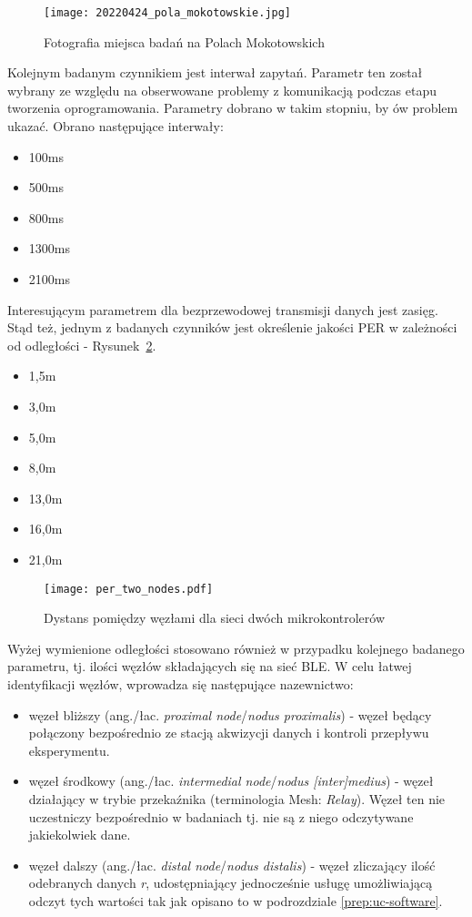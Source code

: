 \begin{figure}[!ht]
	\centering \texttt{[image: 20220424\_pola\_mokotowskie.jpg]} 
	\caption{Fotografia miejsca badań na Polach Mokotowskich}
	\label{rys:mokotowskie}
\end{figure}

Kolejnym badanym czynnikiem jest interwał zapytań. Parametr ten został wybrany ze względu na obserwowane
problemy z komunikacją podczas etapu tworzenia oprogramowania. Parametry dobrano w takim stopniu, by ów problem
ukazać. Obrano następujące interwały:
\begin{itemize} \label {items:ping_intervals}
\item 100ms
\item 500ms
\item 800ms
\item 1300ms
\item 2100ms
\end{itemize}

Interesującym parametrem dla bezprzewodowej transmisji danych jest zasięg. Stąd też, jednym z badanych czynników jest
określenie jakości PER w zależności od odległości - Rysunek~\ref{rys:two_nodes_setup}.
\begin{itemize}
\item 1,5m
\item 3,0m
\item 5,0m
\item 8,0m
\item 13,0m
\item 16,0m
\item 21,0m
\end{itemize}

\begin{figure}[!ht]
	\centering \texttt{[image: per\_two\_nodes.pdf]} 
	\caption{Dystans pomiędzy węzłami dla sieci dwóch mikrokontrolerów}
	\label{rys:two_nodes_setup}
\end{figure}

Wyżej wymienione odległości stosowano również w przypadku kolejnego badanego parametru, tj. ilości węzłów
składających się na sieć BLE. W celu łatwej identyfikacji węzłów, wprowadza się następujące nazewnictwo:
\begin{itemize}
	\item węzeł bliższy (ang./łac. \textit{proximal node}/\textit{nodus proximalis}) - węzeł będący połączony bezpośrednio
	ze stacją akwizycji danych i kontroli przepływu eksperymentu.
	\item węzeł środkowy (ang./łac. \textit{intermedial node}/\textit{nodus [inter]medius}) - węzeł działający w trybie
	przekaźnika (terminologia Mesh: \textit{Relay}). Węzeł ten nie uczestniczy bezpośrednio w badaniach tj. nie są
	z niego odczytywane jakiekolwiek dane.
	\item węzeł dalszy (ang./łac. \textit{distal node}/\textit{nodus distalis}) - węzeł zliczający ilość odebranych danych \textit{r},
	udostępniający jednocześnie usługę umożliwiającą odczyt tych wartości tak jak opisano to w podrozdziale \ref{prep:uc-software}.
\end{itemize}

